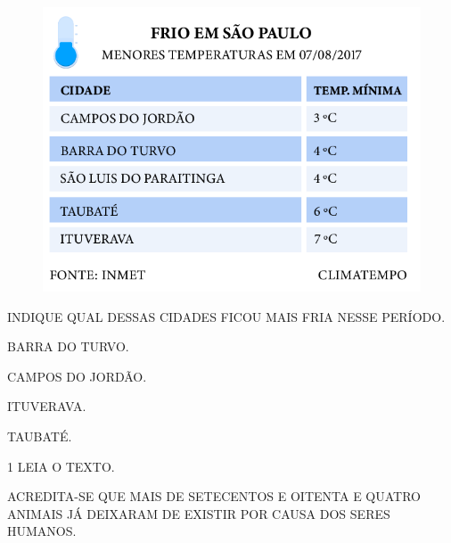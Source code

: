 
\begin{figure}[H]
\includegraphics[width=\textwidth]{./media/SAEB_1ANO_MAT_FIGURA119.png}
\end{figure}

INDIQUE QUAL DESSAS CIDADES FICOU MAIS FRIA NESSE PERÍODO.

\begin{escolha}
\item BARRA DO TURVO.

\item CAMPOS DO JORDÃO.

\item ITUVERAVA.

\item TAUBATÉ.
\end{escolha}

\pagebreak





\num{1} LEIA O TEXTO.

\begin{myquote}
ACREDITA-SE QUE MAIS DE SETECENTOS E OITENTA E QUATRO ANIMAIS JÁ
DEIXARAM DE EXISTIR POR CAUSA DOS SERES HUMANOS.
\end{myquote}

